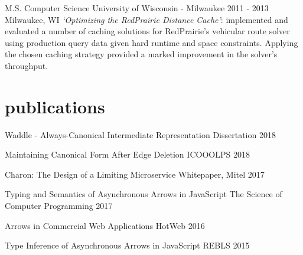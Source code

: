 \documentclass[]{clean-resume}
\begin{document}
\entry
  {M.S. Computer Science}
  {University of Wisconsin - Milwaukee}
  {2011 - 2013}
  {Milwaukee, WI}
  {
    \emph{`Optimizing the RedPrairie Distance Cache'}: implemented and evaluated a number of caching solutions for RedPrairie's vehicular route solver using production query data given hard runtime and space constraints. Applying the chosen caching strategy provided a marked improvement in the solver's throughput.
  }

\section{publications}

\shortentry
  {Waddle - Always-Canonical Intermediate Representation}
  {Dissertation}
  {2018}

\shortentry
  {Maintaining Canonical Form After Edge Deletion}
  {ICOOOLPS}
  {2018}

\shortentry
  {Charon: The Design of a Limiting Microservice}
  {Whitepaper, Mitel}
  {2017}

\shortentry
  {Typing and Semantics of Asynchronous Arrows in JavaScript}
  {The Science of Computer Programming}
  {2017}

\shortentry
  {Arrows in Commercial Web Applications}
  {HotWeb}
  {2016}

\shortentry
  {Type Inference of Asynchronous Arrows in JavaScript}
  {REBLS}
  {2015}
\end{document}
